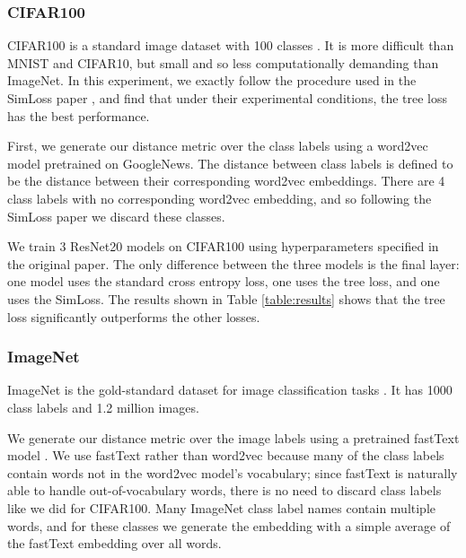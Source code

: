 \documentclass[twoside]{article}
\begin{document}
\subsubsection{CIFAR100}

CIFAR100 is a standard image dataset with 100 classes \citep{krizhevsky2009learning}.
It is more difficult than MNIST and CIFAR10,
but small and so less computationally demanding than ImageNet.
In this experiment, we exactly follow the procedure used in the SimLoss paper \citep{Kobs2020SimLossCS}, 
and find that under their experimental conditions,
the tree loss has the best performance.

First, we generate our distance metric over the class labels using a word2vec model \citep{Mikolov2013EfficientEO} pretrained on GoogleNews.
The distance between class labels is defined to be the distance between their corresponding word2vec embeddings.
There are 4 class labels with no corresponding word2vec embedding,
and so following the SimLoss paper we discard these classes.

We train 3 ResNet20 models on CIFAR100 \citep{He2016DeepRL} using hyperparameters specified in the original paper.
The only difference between the three models is the final layer:
one model uses the standard cross entropy loss, one uses the tree loss, and one uses the SimLoss.
The results shown in Table \ref{table:results} shows that the tree loss significantly outperforms the other losses.

\subsubsection{ImageNet}

ImageNet is the gold-standard dataset for image classification tasks \citep{Russakovsky2015ImageNetLS}.
It has 1000 class labels and 1.2 million images.

We generate our distance metric over the image labels using a pretrained fastText model \citep{bojanowski2017enriching}.
We use fastText rather than word2vec because many of the class labels contain words not in the word2vec model's vocabulary;
since fastText is naturally able to handle out-of-vocabulary words,
there is no need to discard class labels like we did for CIFAR100.
Many ImageNet class label names contain multiple words,
and for these classes we generate the embedding with a simple average of the fastText embedding over all words.
\end{document}
